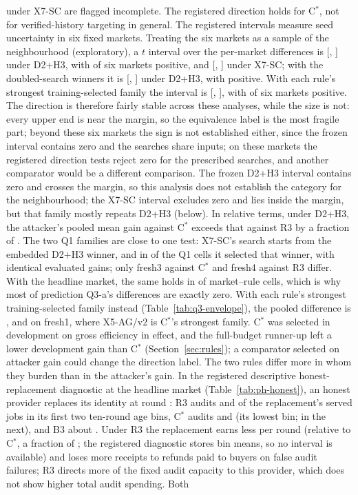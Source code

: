 \documentclass[11pt]{article}
\begin{document}
 under X7-SC are flagged incomplete. The registered direction holds for C$^*$, not for verified-history targeting in general. The registered intervals measure seed uncertainty in six fixed markets. Treating the six markets as a sample of the neighbourhood (exploratory), a $t$ interval over the per-market differences is [, ] under D2+H3, with  of six markets positive, and [, ] under X7-SC; with the doubled-search winners it is [, ] under D2+H3, with  positive. With each rule's strongest training-selected family the interval is [, ], with  of six markets positive. The direction is therefore fairly stable across these analyses, while the size is not: every upper end is near the margin, so the equivalence label is the most fragile part; beyond these six markets the sign is not established either, since the frozen interval contains zero and the searches share inputs; on these markets the registered direction tests reject zero for the prescribed searches, and another comparator would be a different comparison. The frozen D2+H3 interval contains zero and crosses the margin, so this analysis does not establish the category for the neighbourhood; the X7-SC interval excludes zero and lies inside the margin, but that family mostly repeats D2+H3 (below). In relative terms, under D2+H3, the attacker's pooled mean gain against C$^*$ exceeds that against R3 by a fraction of . The two Q1 families are close to one test: X7-SC's search starts from the embedded D2+H3 winner, and in  of the  Q1 cells it selected that winner, with identical evaluated gains; only fresh3 against C$^*$ and fresh4 against R3 differ. With the headline market, the same holds in  of  market--rule cells, which is why most of prediction Q3-a's differences are exactly zero. With each rule's strongest training-selected family instead (Table~\ref{tab:q3-envelope}), the pooled difference is , and  on fresh1, where X5-AG/v2 is C$^*$'s strongest family. C$^*$ was selected in development on gross efficiency in effect, and the full-budget runner-up left a lower development gain than C$^*$ (Section~\ref{sec:rules}); a comparator selected on attacker gain could change the direction label. The two rules differ more in whom they burden than in the attacker's gain. In the registered descriptive honest-replacement diagnostic at the headline market (Table~\ref{tab:ph-honest}), an honest provider replaces its identity at round : R3 audits  and  of the replacement's served jobs in its first two ten-round age bins, C$^*$ audits  and  (its lowest bin;  in the next), and B3 about . Under R3 the replacement earns less per round (relative to C$^*$, a fraction of ; the registered diagnostic stores bin means, so no interval is available) and loses more receipts to refunds paid to buyers on false audit failures; R3 directs more of the fixed audit capacity to this provider, which does not show higher total audit spending. Both 
\end{document}
